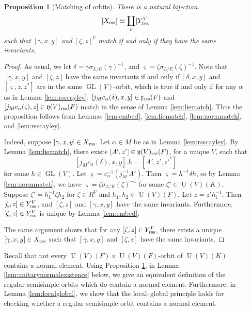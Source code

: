 \documentclass[11pt, reqno]{amsart}
\numberwithin{equation}{subsection}
\theoremstyle{plain}
\newtheorem{proposition}{Proposition}[subsection]
\theoremstyle{definition}
\newcommand{\fy}{\mathfrak y}
\DeclareMathOperator{\GL}{GL}
\DeclareMathOperator{\U}{U}
\newcommand{\rss}{\textnormal{rss}}
\begin{document}
\begin{proposition}[Matching of orbits]
    \label{lem:matching}
There is a natural bijection 
\[
  [X_\rss] \simeq \coprod_{V} [Y_\rss^V]
\]
such that $[\gamma, x, y]$ and $[\zeta, z]^V$ match 
if and only if they have the same invariants.
\end{proposition}
\begin{proof}
As usual, we let 
$\delta = \gamma\sigma_{L/E}(\gamma)^{-1}$, and
$\varsigma = \zeta\sigma_{L/E}(\zeta)^{-1}$.
Note that $[\gamma, x, y]$ and $[\zeta, z]$
have the same invariants if and only if
$[\delta, x, y]$ and $[\varsigma, z, z^\ast]$ 
are in the same $\GL(V)$-orbit, which is true
if and only if for any $\alpha$
as in Lemma \ref{lem:rsscayley},
$[j_M c_\alpha(\delta), x, y] \in \mathfrak x_\rss(F)$ and 
$[j_M c_\alpha(\varsigma), z] \in \mathfrak y(V)_\rss(F)$ 
match in the sense of Lemma \ref{lem:liematch}.
Thus the proposition follows from Lemmas \ref{lem:embed},
\ref{lem:liematch}, 
\ref{lem:normmatch}, and \ref{lem:rsscayley}.

Indeed, suppose $[\gamma, x, y] \in X_\rss$.
Let $\alpha \in M$ be as in Lemma \ref{lem:rsscayley}.
By Lemma \ref{lem:liematch}, there exists
$[A', z'] \in \fy(V)_\rss(F)$, for a unique $V$, such
that 
\[
    [j_M c_\alpha(\delta), x, y].h =
    [A', z', z'^\ast]
\]
for some $h \in \GL(V)$.
Let $\varsigma = c_\alpha^{-1}(j_M^{-1} A')$.
Then $\varsigma = h^{-1}\delta h$, so by Lemma
\ref{lem:normmatch}, we have $\varsigma = 
\zeta\sigma_{L/E}(\zeta)^{-1}$ for some $\zeta'
\in \U(V)(K)$. Suppose 
$\zeta' = h_1^{-1}\zeta h_2$ for $\zeta \in R^V$
and $h_1, h_2 \in \U(V)(F)$.
Let $z = z' h_1^{-1}$.
Then $[\zeta, z] \in Y_\rss^V$, and $[\zeta, z]$
and $[\gamma, x, y]$ 
have the same invariants.
Furthermore, $[\zeta, z] \in Y_\rss^V$ is unique by Lemma
\ref{lem:embed}.

The same argument shows that for any $[\zeta, z]
\in Y_\rss^V$, there exists a unique $[\gamma, x, y]
\in X_\rss$ such that $[\gamma, x, y]$ and
$[\zeta, z]$ have the same invariants.
\end{proof}

Recall that not every $\U(V)(F) \times \U(V)(F)$-orbit
of $\U(V)(K)$ contains a normal element.
Using Proposition \ref{lem:matching}, in Lemma
\ref{lem:unitarynormalexistence} below, we give
an equivalent definition of the regular semisimple
orbits which do contain a normal element.
Furthermore, in Lemma \ref{lem:localglobal}, we 
show that the local--global principle holds
for checking whether a regular semisimple orbit contains a normal element.
\end{document}
